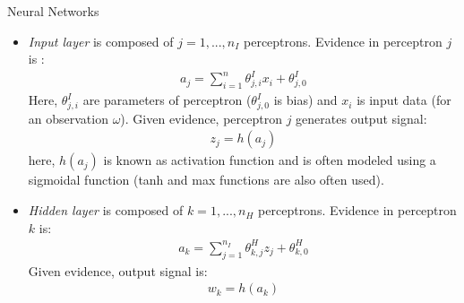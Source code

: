 \documentclass[9pt]{beamer}
\begin{document}
\begin{frame}{Neural Networks}

\begin{itemize}
   \setlength{\itemsep}{5pt}
\item {\em Input layer} is composed of $j=1,...,n_I$ perceptrons. Evidence in perceptron $j$ is :
\begin{align*}
a_j=\sum_{i=1}^n\theta_{j,i}^{I}x_i+\theta_{j,0}^I
\end{align*}
Here, $\theta_{j,i}^I$ are parameters of perceptron ($\theta_{j,0}^I$ is bias) and $x_i$ is input data (for an observation $\omega$).  Given evidence, perceptron $j$ generates output signal:
\begin{align*}
z_j=h(a_j)
\end{align*}
here, $h(a_j)$ is known as activation function and is often modeled using a sigmoidal function (tanh and max functions are also often used). 
\item {\em Hidden layer} is composed of $k=1,...,n_H$ perceptrons. Evidence in perceptron $k$ is:
\begin{align*}
a_k=\sum_{j=1}^{n_I}\theta_{k,j}^{H}z_j+\theta_{k,0}^H
\end{align*}
Given evidence, output signal is:
\begin{align*}
w_k=h(a_k)
\end{align*}

\end{itemize}

\end{frame}

\end{document}
